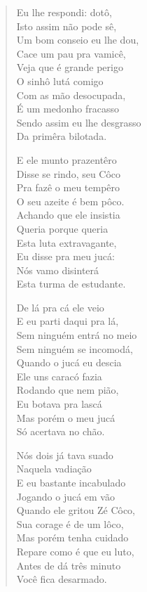 \begin{verse}
Eu lhe respondi: dotô,\\
Isto assim não pode sê,\\
Um bom conseio eu lhe dou,\\
Cace um pau pra vamicê,\\
Veja que é grande perigo\\
O sinhô lutá comigo\\
Com as mão desocupada,\\
É um medonho fracasso\\
Sendo assim eu lhe desgrasso\\
Da primêra bilotada.

E ele munto prazentêro\\
Disse se rindo, seu Côco\\
Pra fazê o meu tempêro\\
O seu azeite é bem pôco.\\
Achando que ele insistia\\
Queria porque queria\\
Esta luta extravagante,\\
Eu disse pra meu jucá:\\
Nós vamo disinterá\\
Esta turma de estudante.

De lá pra cá ele veio\\
E eu parti daqui pra lá,\\
Sem ninguém entrá no meio\\
Sem ninguém se incomodá,\\
Quando o jucá eu descia\\
Ele uns caracó fazia\\
Rodando que nem pião,\\
Eu botava pra lascá\\
Mas porém o meu jucá\\
Só acertava no chão.

Nós dois já tava suado\\
Naquela vadiação\\
E eu bastante incabulado\\
Jogando o jucá em vão\\
Quando ele gritou Zé Côco,\\
Sua corage é de um lôco,\\
Mas porém tenha cuidado\\
Repare como é que eu luto,\\
Antes de dá três minuto\\
Você fica desarmado.


\end{verse}
